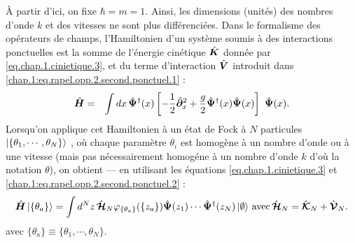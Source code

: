À partir d’ici, on fixe $\hbar = m = 1 $. Ainsi, les dimensions (unités) des nombres d’onde $k$ et des vitesses ne sont plus différenciées.
Dans le formalisme des opérateurs de champs, l’Hamiltonien d’un système soumis à des interactions ponctuelles est la somme de l’énergie cinétique $\hat{\bm{K}}$ donnée par \eqref{eq.chap.1.cinietique.3}, et du terme d’interaction $\hat{\bm{V}}$ introduit dans \eqref{chap.1:eq.rapel.opp.2.second.ponctuel.1} :
\begin{eqnarray}
	\operator{H} & = & \int dx \, \operator{\Psi}^\dag (x)\left [-\frac{1}{2}\operator{\partial}_x^2 + \frac{g}{2}  \operator{\Psi}^\dag (x) \operator{\Psi} (x) \right ] \operator{\Psi} (x) \label{chap:1:ham.mod}.
\end{eqnarray}
Lorsqu’on applique cet Hamiltonien à un état de Fock à $N$ particules $\ket{\{\theta_1 , \cdots , \theta_N \}} $, où chaque paramètre $\theta_i$ est homogène à un nombre d’onde ou à une vitesse (mais pas nécessairement homogéne à un nombre d'onde $k$ d’où la notation $\theta$), on obtient — en utilisant les équations \eqref{eq.chap.1.cinietique.3} et \eqref{chap.1:eq.rapel.opp.2.second.ponctuel.2} : %
\begin{eqnarray}
\hat{\bm{H}}\ket{\{\theta_a\}} =  \int d^Nz \, \hat{\bm{\mathcal{H}}}_N \varphi_{\{\theta_a\}}(\{z_a\})\hat{\bm{\Psi}}(z_1)\cdots \hat{\bm{\Psi}}^\dag(z_N) \ket{\emptyset}\, \mbox{avec} \, \hat{\bm{\mathcal{H}}}_N 	
 =  \hat{\bm{\mathcal{K}}}_N  +  \hat{\bm{\mathcal{V}}}_N . 
\end{eqnarray}
avec $\{\theta_a\} \equiv \{ \theta_1 , \cdots , \theta_N \} $.




